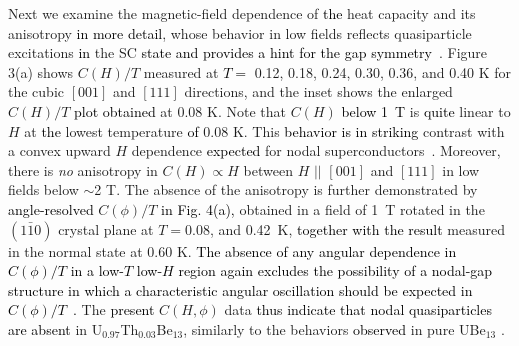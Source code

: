\documentclass[twocolumn, prl]{revtex4}%
\newcommand{\correct}[1]{\textcolor{black}{#1}}
\begin{document}
\color{black}

  


Next we  examine the magnetic-field dependence of \correct{the} heat capacity and its anisotropy \correct{in more detail}, whose  behavior  in low fields reflects quasiparticle excitations  \correct{in} the SC \correct{state and provides a hint for the gap symmetry}~\cite{Volovik_JETP_Lett_1993, Vekhter_PRBR_1999, Sakakibara_ROPP_2016}.
Figure 3(a)
 shows  $C(H)/T$ measured at \correct{$T=$} 0.12, 0.18, 0.24, 0.30, 0.36, and 0.40 K  for  the cubic $[001]$ and $[111]$ directions, and the inset shows the enlarged $C(H)/T$ \correct{plot obtained}  at  0.08 K.
Note  that $C(H)$  \correct{below 1~T} is \correct{quite} linear to $H$ at \correct{the} lowest temperature \correct{of} 0.08 K.
This  \correct{behavior is in striking} contrast with a convex upward $H$ dependence  \correct{expected} for nodal superconductors~\cite{Nodal_HeatCapacity}.
Moreover,  there is \textit{no} anisotropy in  $C(H) \propto H$ between $H$ $||$  $[001]$ and $[111]$ in low fields below $\sim$2 T.
The absence of the anisotropy is further demonstrated by \correct{angle-resolved} $C(\phi)/T$
 \correct{in Fig. 4(a),}
  obtained in a field of 1~T rotated in the $(1\bar{1}0)$ crystal plane at $T=$0.08, and 0.42~K, \correct{together with the result} measured  in the normal state at 0.60 K.
\correct{The absence of any angular dependence in $C(\phi)/T$ in a low-$T$ low-$H$ region again excludes  the possibility of a nodal-gap structure in which a characteristic angular oscillation should be expected in $C(\phi)/T$~\cite{Vekhter_PRBR_1999}.}
The \correct{present} $C(H, \phi)$ data \correct{thus indicate that  nodal quasiparticles are absent}
  in  U$_{0.97}$Th$_{0.03}$Be$_{13}$, similarly to the behaviors \correct{observed} in  pure UBe$_{13}$ 
 \cite{YShimizu_PRL_2015}.
 
\end{document}
